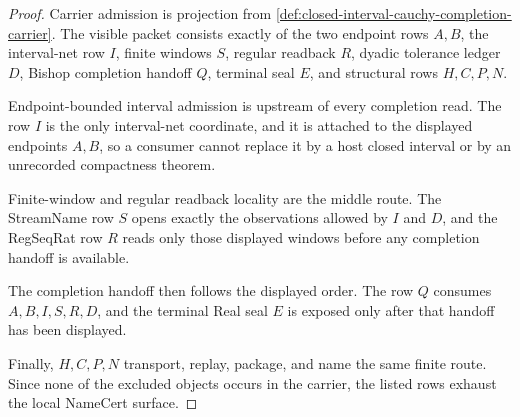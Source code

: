 \begin{proof}
Carrier admission is projection from \autoref{def:closed-interval-cauchy-completion-carrier}. The visible packet consists exactly of the two endpoint rows $A,B$, the interval-net row $I$, finite windows $S$, regular readback $R$, dyadic tolerance ledger $D$, Bishop completion handoff $Q$, terminal seal $E$, and structural rows $H,C,P,N$.

Endpoint-bounded interval admission is upstream of every completion read. The row $I$ is the only interval-net coordinate, and it is attached to the displayed endpoints $A,B$, so a consumer cannot replace it by a host closed interval or by an unrecorded compactness theorem.

Finite-window and regular readback locality are the middle route. The StreamName row $S$ opens exactly the observations allowed by $I$ and $D$, and the RegSeqRat row $R$ reads only those displayed windows before any completion handoff is available.

The completion handoff then follows the displayed order. The row $Q$ consumes $A,B,I,S,R,D$, and the terminal Real seal $E$ is exposed only after that handoff has been displayed.

Finally, $H,C,P,N$ transport, replay, package, and name the same finite route. Since none of the excluded objects occurs in the carrier, the listed rows exhaust the local NameCert surface.
\end{proof}

